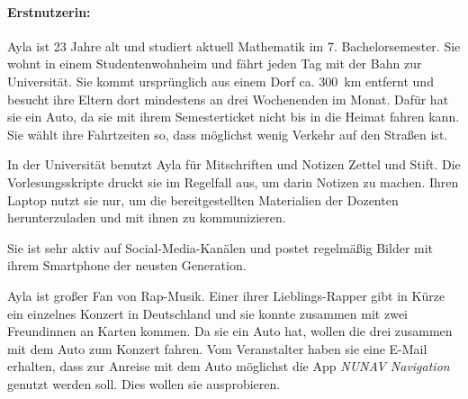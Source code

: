 \paragraph{Erstnutzerin:} Ayla ist 23 Jahre alt und studiert aktuell Mathematik im 7. Bachelorsemester. Sie wohnt in einem Studentenwohnheim und fährt jeden Tag mit der Bahn zur Universität. Sie kommt ursprünglich aus einem Dorf ca. 300~km entfernt und besucht ihre Eltern dort mindestens an drei Wochenenden im Monat. Dafür hat sie ein Auto, da sie mit ihrem Semesterticket nicht bis in die Heimat fahren kann. Sie wählt ihre Fahrtzeiten so, dass möglichst wenig Verkehr auf den Straßen ist.

In der Universität benutzt Ayla für Mitschriften und Notizen Zettel und Stift. Die Vorlesungsskripte druckt sie im Regelfall aus, um darin Notizen zu machen. Ihren Laptop nutzt sie nur, um die bereitgestellten Materialien der Dozenten herunterzuladen und mit ihnen zu kommunizieren.

Sie ist sehr aktiv auf Social-Media-Kanälen und postet regelmäßig Bilder mit ihrem Smartphone der neusten Generation.

Ayla ist großer Fan von Rap-Musik. Einer ihrer Lieblings-Rapper gibt in Kürze ein einzelnes Konzert in Deutschland und sie konnte zusammen mit zwei Freundinnen an Karten kommen. Da sie ein Auto hat, wollen die drei zusammen mit dem Auto zum Konzert fahren. Vom Veranstalter haben sie eine E-Mail erhalten, dass zur Anreise mit dem Auto möglichst die App \textit{NUNAV Navigation} genutzt werden soll. Dies wollen sie ausprobieren.

\newpage

